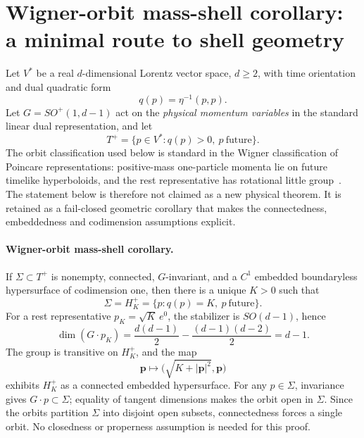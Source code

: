 \documentclass[11pt,a4paper]{article}
\begin{document}
\section{Wigner-orbit mass-shell corollary: a minimal route to shell geometry}
\label{sec:orbit-shell-v090}
Let $V^*$ be a real $d$-dimensional Lorentz vector space, $d\ge2$, with time orientation and dual quadratic form
\begin{equation}
 q(p)=\eta^{-1}(p,p).
\end{equation}
Let $G=SO^+(1,d-1)$ act on the \emph{physical momentum variables} in the standard linear dual representation, and let
\begin{equation}
 T^+=\{p\in V^*:q(p)>0,\ p\ \text{future}\}.
\end{equation}
The orbit classification used below is standard in the Wigner classification of Poincare representations: positive-mass one-particle momenta lie on future timelike hyperboloids, and the rest representative has rotational little group~\cite{wigner1939,weinberg1995}.  The statement below is therefore not claimed as a new physical theorem.  It is retained as a fail-closed geometric corollary that makes the connectedness, embeddedness and codimension assumptions explicit.

\paragraph{Wigner-orbit mass-shell corollary.}
If $\Sigma\subset T^+$ is nonempty, connected, $G$-invariant, and a $C^1$ embedded boundaryless hypersurface of codimension one, then there is a unique $K>0$ such that
\begin{equation}
 \boxed{\Sigma=H_K^+=\{p:q(p)=K,\ p\ \text{future}\}.}
 \label{eq:orbit-theorem-v090}
\end{equation}
For a rest representative $p_K=\sqrt K\,e^0$, the stabilizer is $SO(d-1)$, hence
\begin{equation}
 \dim(G\cdot p_K)=\frac{d(d-1)}2-\frac{(d-1)(d-2)}2=d-1.
\end{equation}
The group is transitive on $H_K^+$, and the map
\begin{equation}
 \mathbf p\longmapsto \bigl(\sqrt{K+|\mathbf p|^2},\mathbf p\bigr)
\end{equation}
exhibits $H_K^+$ as a connected embedded hypersurface.  For any $p\in\Sigma$, invariance gives $G\cdot p\subset\Sigma$; equality of tangent dimensions makes the orbit open in $\Sigma$.  Since the orbits partition $\Sigma$ into disjoint open subsets, connectedness forces a single orbit.  No closedness or properness assumption is needed for this proof.
\end{document}
